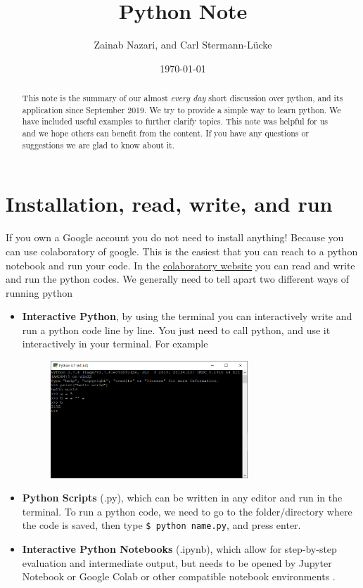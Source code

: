 \documentclass[10pt,a4paper]{article}
\author{Zainab Nazari, and Carl Stermann-L\"ucke}
\title{Python Note}
\date{\today}
\begin{document}
\maketitle
\begin{abstract}
    This note is the summary of our almost \textit{every day} short discussion over python, and its application since September 2019. We try to provide a simple way to learn python. We have included useful examples to further clarify topics. This note was helpful for us and we hope others can benefit from the content. If you have any questions or suggestions we are glad to know about it.
\end{abstract}
\tableofcontents













\section{Installation, read, write, and run}
If you own a Google account you do not need to install anything! Because you can use colaboratory of google. This is the easiest that you can reach to a python notebook and run your code.
In the   \href{https://colab.research.google.com}{colaboratory website}  you can read and write and run the python codes.
We generally need to tell apart two different ways of running python
\begin{itemize}
\item \textbf{Interactive Python}, by using the terminal you can interactively write and run a python code line by line. You just need to call python, and use it interactively in your terminal. For example
\begin{figure}[htbp]\centering
\includegraphics[width=0.7\textwidth]{interactive-python-terminal.PNG}
\end{figure}
\item \textbf{Python Scripts} (.py), which can be written in any editor and run in the terminal. To run a python code, we need to go to the folder/directory where the code is saved, then type \texttt{\$ python name.py}, and press enter. 
\item \textbf{Interactive Python Notebooks} (.ipynb), which allow for step-by-step evaluation and intermediate output, but needs to be opened by Jupyter Notebook or Google Colab or other compatible notebook environments .
\end{itemize}
\end{document}
